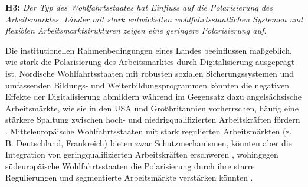 \textbf{H3:} \textit{Der Typ des Wohlfahrtsstaates hat Einfluss auf die Polarisierung des 
Arbeitsmarktes. Länder mit stark entwickelten wohlfahrtsstaatlichen Systemen und flexiblen 
Arbeitsmarktstrukturen zeigen eine geringere Polarisierung auf.}

Die institutionellen Rahmenbedingungen eines Landes beeinflussen maßgeblich, wie stark die 
Polarisierung des Arbeitsmarktes durch Digitalisierung ausgeprägt ist. Nordische 
Wohlfahrtsstaaten mit robusten sozialen Sicherungssystemen und umfassenden Bildungs- und 
Weiterbildungsprogrammen könnten die negativen Effekte der Digitalisierung abmildern 
\parencite[S. 27–28]{espingandersen1990thethree} während im Gegensatz dazu  
angelsächsische Arbeitsmärkte, wie sie in den USA und Großbritannien vorherrschen, häufig 
eine stärkere Spaltung zwischen hoch- und niedrigqualifizierten Arbeitskräften fördern
\parencite[vgl.][S. 28–30]{hall2001varieties}. Mitteleuropäische Wohlfahrtsstaaten mit stark 
regulierten Arbeitsmärkten (z. B. Deutschland, Frankreich) bieten zwar Schutzmechanismen, 
könnten aber die Integration von geringqualifizierten Arbeitskräften erschweren 
\parencite[vgl.][S. 25–26]{hall2001varieties}, wohingegen südeuropäische Wohlfahrtsstaaten 
die Polarisierung durch ihre starre Regulierungen und segmentierte Arbeitsmärkte verstärken 
könnten \parencite[S. 19–21]{ferrera1996thesouthern}.
